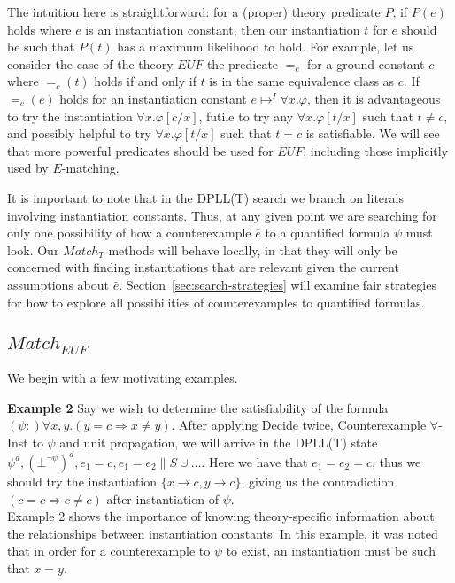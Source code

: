 \documentclass{llncs}
\begin{document}
The intuition here is straightforward: for a (proper) theory predicate $P$, if $P(e)$ holds where $e$ is an instantiation constant, then our instantiation $t$ for $e$ should be such that $P( t )$ has a maximum likelihood to hold.
For example, let us consider the case of the theory $EUF$ the predicate $=_c$ for a ground constant $c$ where $=_c( t )$ holds if and only if $t$ is in the same equivalence class as $c$.
If $=_c( e )$ holds for an instantiation constant $e \mapsto^I \forall x. \varphi$, then it is advantageous to try the instantiation $\forall x. \varphi[c/x]$, futile to try any $\forall x. \varphi[t/x]$ such that $t \neq c$, and possibly helpful to try $\forall x. \varphi[t/x]$ such that $t = c$ is satisfiable.
We will see that more powerful predicates should be used for $EUF$, including those implicitly used by $E$-matching.

It is important to note that in the DPLL(T) search we branch on literals involving instantiation constants.
Thus, at any given point we are searching for only one possibility of how a counterexample $\bar{e}$ to a quantified formula $\psi$ must look.
Our $Match_T$ methods will behave locally, in that they will only be concerned with finding instantiations that are relevant given the current assumptions about $\bar{e}$.
Section~\ref{sec:search-strategies} will examine fair strategies for how to explore all possibilities of counterexamples to quantified formulas.

\subsection{$Match_{EUF}$}

We begin with a few motivating examples.

{\bf Example 2} 
Say we wish to determine the satisfiability of the formula $(\psi :) \forall x, y. ( y = c \Rightarrow x \neq y )$.
After applying Decide twice, Counterexample $\forall$-Inst to $\psi$ and unit propagation, we will arrive in the DPLL(T) state $\psi^d, (\bot^{ \neg \psi })^d, e_1 = c, e_1 = e_2 \parallel S \cup \ldots$.
Here we have that $e_1 = e_2 = c$, thus we should try the instantiation $\{ x \rightarrow c, y \rightarrow c \}$, giving us the contradiction $( c = c \Rightarrow c \neq c )$ after instantiation of $\psi$. \\

Example 2 shows the importance of knowing theory-specific information about the relationships between instantiation constants.  
In this example, it was noted that in order for a counterexample to $\psi$ to exist, an instantiation must be such that $x = y$.
\end{document}
